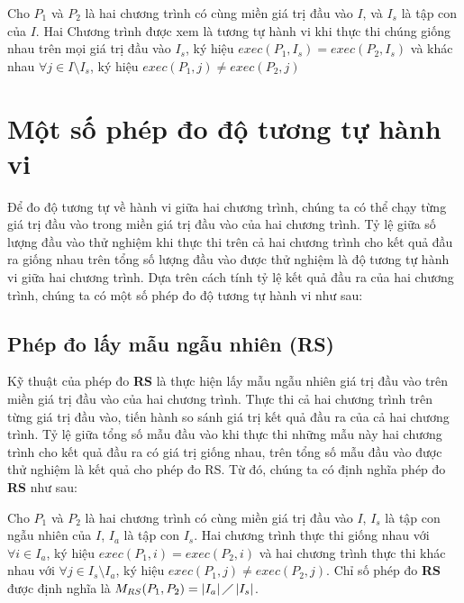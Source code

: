 \begin{definition}
Cho $P_{1}$ và $P_{2}$ là hai chương trình có cùng miền giá trị đầu vào $I$, và $I_{s}$ là tập con của $I$. Hai Chương trình được xem là tương tự hành vi khi thực thi chúng giống nhau trên mọi giá trị đầu vào $I_{s}$, ký hiệu  $exec(P_{1}, I_{s}) = exec(P_{2}, I_{s})$ và khác nhau $\forall j \in I \setminus I_{s}$, ký hiệu $exec(P_{1}, j) \neq exec(P_{2}, j)$
\end{definition}

\section{Một số phép đo độ tương tự hành vi}
Để đo độ tương tự về hành vi giữa hai chương trình, chúng ta có thể chạy từng giá trị đầu vào trong miền giá trị đầu vào của hai chương trình. Tỷ lệ giữa số lượng đầu vào thử nghiệm khi thực thi trên cả hai chương trình cho kết quả đầu ra giống nhau trên tổng số lượng đầu vào được thử nghiệm là độ tương tự hành vi giữa hai chương trình. Dựa trên cách tính tỷ lệ kết quả đầu ra của hai chương trình, chúng ta có một số phép đo độ tương tự hành vi như sau:

\subsection{Phép đo lấy mẫu ngẫu nhiên (RS)}
Kỹ thuật của phép đo \textbf{RS} là thực hiện lấy mẫu ngẫu nhiên giá trị đầu vào trên miền giá trị đầu vào của hai chương trình. Thực thi cả hai chương trình trên từng giá trị đầu vào, tiến hành so sánh giá trị kết quả đầu ra của cả hai chương trình. Tỷ lệ giữa tổng số mẫu đầu vào khi thực thi những mẫu này hai chương trình cho kết quả đầu ra có giá trị giống nhau, trên tổng số mẫu đầu vào được thử nghiệm là kết quả cho phép đo RS. Từ đó, chúng ta có định nghĩa phép đo \textbf{RS} như sau:

\begin{definition}[Phép đo RS]
	Cho $P_{1}$ và $P_{2}$ là hai chương trình có cùng miền giá trị đầu vào $I$, $I_{s}$ là tập con ngẫu nhiên của $I$, $I_{a}$ là tập con $I_{s}$. Hai chương trình thực thi giống nhau với $\forall i \in I_{a}$, ký hiệu $exec(P_{1}, i) = exec(P_{2}, i)$ và hai chương trình thực thi khác nhau với $\forall j \in I_{s} \setminus I_{a}$, ký hiệu $exec(P_{1}, j) \neq exec(P_{2}, j)$. Chỉ số phép đo \textbf{RS} được định nghĩa là $M_{RS}(P_{1}, P_{2}) = \left|I_{a}\right| \diagup \left|I_{s}\right| $.
\end{definition}

